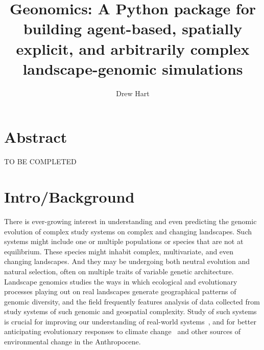 ﻿\documentclass{article}
\title{Geonomics: A Python package for building agent-based, spatially explicit, and arbitrarily complex landscape-genomic simulations}
\author{Drew Hart}
\begin{document}
\maketitle


\section{Abstract}
{\LARGE TO BE COMPLETED}


\section{Intro/Background}
There is ever-growing interest in understanding and even predicting
the genomic evolution of complex study systems on complex and changing landscapes.
Such systems might include one or multiple populations or species that are not
at equilibrium. These species might inhabit complex, multivariate, and even changing landscapes.
And they may be undergoing both neutral evolution and natural selection, often on multiple traits
of variable genetic architecture.
Landscape genomics studies the ways in which ecological and evolutionary processes playing
out on real landscapes generate geographical patterns of genomic diversity,
and the field frequently features analysis of data collected from study systems of such
genomic and geospatial complexity.
Study of such systems is crucial for improving our understanding of real-world systems~\cite{pelletier,barrett},
and for better anticipating evolutionary responses to climate change~\cite{bay}
and other sources of environmental change in the Anthropocene.
\end{document}
